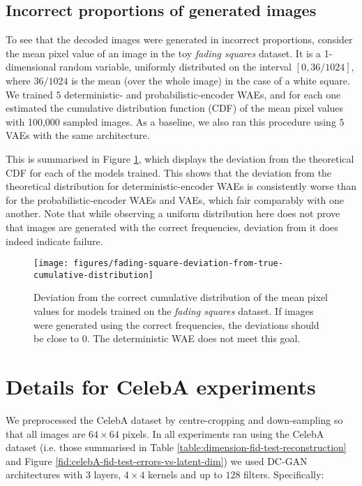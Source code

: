 \subsection{Incorrect proportions of generated images}\label{appendix:wrong_proportions}

To see that the decoded images were generated in incorrect proportions, consider the mean pixel value of an image in the toy \emph{fading squares} dataset. It is a 1-dimensional random variable, uniformly distributed on the interval $[0, 36/1024]$, where $36/1024$ is the mean (over the whole image) in the case of a white square. We trained $5$ deterministic- and probabilistic-encoder WAEs, and for each one estimated the cumulative distribution function (CDF) of the mean pixel values with 100,000 sampled images.
As a baseline, we also ran this procedure using $5$ VAEs with the same architecture.

This is summarised in Figure \ref{fig:fading-squares-deviation-from-cumulative}, which displays the deviation from the theoretical CDF for each of the models trained. This shows that the deviation from the theoretical distribution for deterministic-encoder WAEs is consistently worse than for the probabilistic-encoder WAEs and VAEs, which fair comparably with one another. Note that while observing a uniform distribution here does not prove that images are generated with the correct frequencies, deviation from it does indeed indicate failure.

\begin{figure}[t!]
	\centering
	\texttt{[image: figures/fading-square-deviation-from-true-cumulative-distribution]}
	\caption{\label{fig:fading-squares-deviation-from-cumulative} Deviation from the correct cumulative distribution of the mean pixel values for models trained on the \emph{fading squares} dataset. If images were generated using the correct frequencies, the deviations should be close to $0$. The deterministic WAE does not meet this goal.}
\end{figure}



\section{Details for CelebA experiments}\label{appendix:celebA}

We preprocessed the CelebA dataset by centre-cropping and down-sampling so that all images are $64\times 64$ pixels. 
In all experiments ran using the CelebA dataset (i.e. those summarised in Table \ref{table:dimension-fid-test-reconstruction} and Figure \ref{fid:celebA-fid-test-errors-vs-latent-dim}) we used  DC-GAN architectures with $3$ layers, $4\times 4$ kernels and up to $128$ filters. Specifically:


